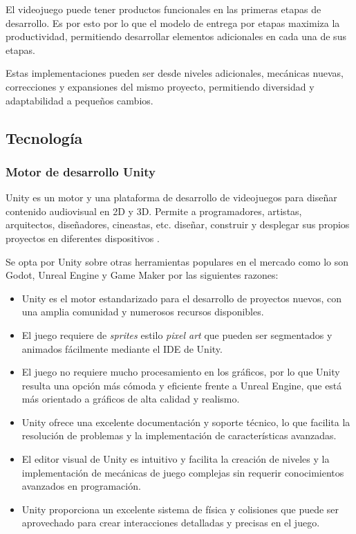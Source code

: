 \documentclass[12pt,twoside]{article}
\begin{document}
	El videojuego puede tener productos funcionales en las primeras etapas de desarrollo. Es por esto por lo que el modelo de entrega por etapas maximiza la productividad, permitiendo desarrollar elementos adicionales en cada una de sus etapas. 
	
	Estas implementaciones pueden ser desde niveles adicionales, mecánicas nuevas, correcciones y expansiones del mismo proyecto, permitiendo diversidad y adaptabilidad a pequeños cambios.
	
	\subsection{Tecnología}	%

	\subsubsection{Motor de desarrollo Unity}
	Unity es un motor y una plataforma de desarrollo de videojuegos para diseñar contenido audiovisual en 2D y 3D. Permite a programadores, artistas, arquitectos, diseñadores, cineastas, etc. diseñar, construir y desplegar sus propios proyectos en diferentes dispositivos \cite{app: unity}.

Se opta por Unity sobre otras herramientas populares en el mercado como lo son Godot, Unreal Engine y Game Maker por las siguientes razones:

\begin{itemize}
	\item Unity es el motor estandarizado para el desarrollo de proyectos nuevos, con una amplia comunidad y numerosos recursos disponibles.
	\item El juego requiere de \textit{sprites} estilo \textit{pixel art} que pueden ser segmentados y animados fácilmente mediante el IDE de Unity.
	\item El juego no requiere mucho procesamiento en los gráficos, por lo que Unity resulta una opción más cómoda y eficiente frente a Unreal Engine, que está más orientado a gráficos de alta calidad y realismo.
	\item Unity ofrece una excelente documentación y soporte técnico, lo que facilita la resolución de problemas y la implementación de características avanzadas.
	\item El editor visual de Unity es intuitivo y facilita la creación de niveles y la implementación de mecánicas de juego complejas sin requerir conocimientos avanzados en programación.
	\item Unity proporciona un excelente sistema de física y colisiones que puede ser aprovechado para crear interacciones detalladas y precisas en el juego.
\end{itemize}
\end{document}
